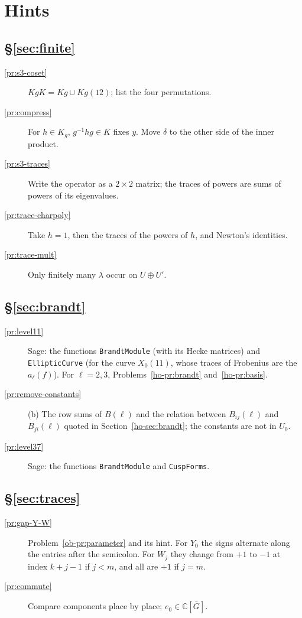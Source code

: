 \documentclass[reqno]{amsart}
\theoremstyle{plain}
\theoremstyle{definition}
\newcommand{\C}{\mathbb{C}}
\newcommand{\tl}[1]{\texttt{#1}}
\begin{document}
\section*{Hints}

\subsection*{\S\ref{sec:finite}}
\begin{description}
\item[\ref{pr:s3-coset}] \(KgK = Kg \cup K g (12)\); list the four permutations.
\item[\ref{pr:compress}] For \(h \in K_g\), \(g^{-1}hg \in K\) fixes \(y\).  Move \(\delta\) to the other side of the inner product.
\item[\ref{pr:s3-traces}] Write the operator as a \(2 \times 2\) matrix; the traces of powers are sums of powers of its eigenvalues.
\item[\ref{pr:trace-charpoly}] Take \(h = 1\), then the traces of the powers of \(h\), and Newton's identities.
\item[\ref{pr:trace-mult}] Only finitely many \(\lambda\) occur on \(U \oplus U'\).
\end{description}

\subsection*{\S\ref{sec:brandt}}
\begin{description}
\item[\ref{pr:level11}] Sage: the functions \tl{BrandtModule} (with its Hecke matrices) and \tl{EllipticCurve} (for the curve \(X_0(11)\), whose traces of Frobenius are the \(a_\ell(f)\)).  For \(\ell = 2, 3\), Problems~\ref{ho-pr:brandt} and~\ref{ho-pr:basis}.
\item[\ref{pr:remove-constants}] (b) The row sums of \(B(\ell)\) and the relation between \(B_{ij}(\ell)\) and \(B_{ji}(\ell)\) quoted in Section~\ref{ho-sec:brandt}; the constants are not in \(U_0\).
\item[\ref{pr:level37}] Sage: the functions \tl{BrandtModule} and \tl{CuspForms}.
\end{description}

\subsection*{\S\ref{sec:traces}}
\begin{description}
\item[\ref{pr:gap-Y-W}] Problem~\ref{ob-pr:parameter} and its hint.  For \(Y_0\) the signs alternate along the entries after the semicolon.  For \(W_j\) they change from \(+1\) to \(-1\) at index \(k + j - 1\) if \(j < m\), and all are \(+1\) if \(j = m\).
\item[\ref{pr:commute}] Compare components place by place; \(e_0 \in \C[\bar G]\).
\end{description}
\end{document}
